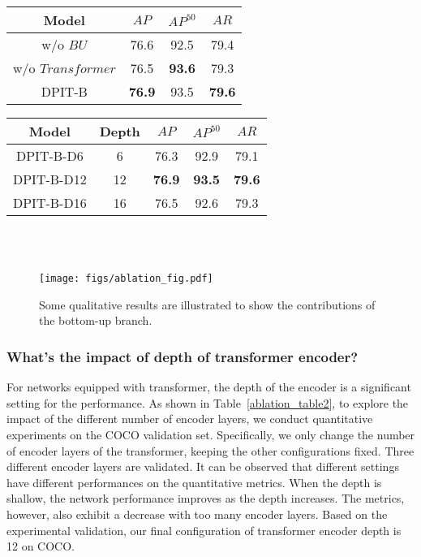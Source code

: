 \documentclass[runningheads]{llncs}
\begin{document}
\begin{minipage}[c]{0.5\textwidth}
\centering
{}
\label{ablation_table1}
\begin{tabular}{c|ccc}
  \toprule
  Model   & $AP$  & $AP^{50}$  & $AR$               \\
  \midrule
  \midrule
  w/o $BU$   & 76.6 & 92.5  & 79.4    \\
  w/o $Transformer$   & 76.5 & \textbf{93.6}  & 79.3    \\
  DPIT-B  & \textbf{76.9} & 93.5 & \textbf{79.6} \\
  \bottomrule
 \end{tabular}
\end{minipage}
\qquad
\begin{minipage}[c]{0.4\textwidth}
\centering
{}
\label{ablation_table2}
\begin{tabular}{c|c|ccc}
  \toprule
  Model   & Depth & $AP$ & $AP^{50}$  & $AR$ \\
  \midrule
  \midrule
  DPIT-B-D6  & 6  & 76.3 & 92.9 & 79.1    \\
  DPIT-B-D12 & 12 & \textbf{76.9} & \textbf{93.5} & \textbf{79.6}    \\
  DPIT-B-D16 & 16 & 76.5 & 92.6 & 79.3    \\
  \bottomrule
\end{tabular}
\end{minipage}
\\
\\
\begin{figure*}
  \centerline{\texttt{[image: figs/ablation\_fig.pdf]}}
  \caption{Some qualitative results are illustrated to show the contributions of the bottom-up branch.}
  \label{ablation_fig}
\end{figure*}
\subsubsection{What's the impact of depth of transformer encoder?}
For networks equipped with transformer, the depth of the encoder is a significant setting for the performance. As shown in Table~\ref{ablation_table2}, to explore the impact of the different number of encoder layers, we conduct quantitative experiments on the COCO validation set. Specifically, we only change the number of encoder layers of the transformer, keeping the other configurations fixed. Three different encoder layers are validated. It can be observed that different settings have different performances on the quantitative metrics. When the depth is shallow, the network performance improves as the depth increases. The metrics, however, also exhibit a decrease with too many encoder layers. Based on the
experimental validation, our final configuration of transformer encoder depth is 12 on COCO. 
\end{document}
